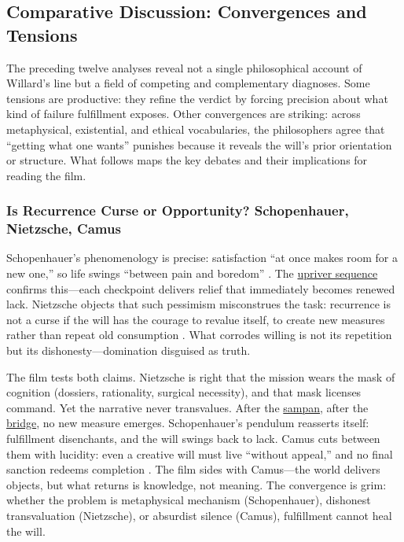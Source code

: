\subsection*{Comparative Discussion: Convergences and Tensions}
\label{ssec:iv-comparative-discussion}

The preceding twelve analyses reveal not a single philosophical account of Willard's line but
a field of competing and complementary diagnoses. Some tensions are productive: they refine
the verdict by forcing precision about what kind of failure fulfillment exposes. Other
convergences are striking: across metaphysical, existential, and ethical vocabularies, the
philosophers agree that ``getting what one wants'' punishes because it reveals the will's
prior orientation or structure. What follows maps the key debates and their implications for
reading the film.

\subsubsection*{Is Recurrence Curse or Opportunity? Schopenhauer, Nietzsche, Camus}

Schopenhauer's phenomenology is precise: satisfaction ``at once makes room for a new one,'' so
life swings ``between pain and boredom'' \parencite[pp.~312, 319]{SchopenhauerWWR1969}. The
\hyperref[scene:upriver-journey]{upriver sequence} confirms this---each checkpoint delivers
relief that immediately becomes renewed lack. Nietzsche objects that such pessimism
misconstrues the task: recurrence is not a curse if the will has the courage to revalue
itself, to create new measures rather than repeat
old consumption \parencite[\S\S 34, 283]{NietzscheBGE1990}. What corrodes willing is not its
repetition but its dishonesty---domination disguised as truth.

The film tests both claims. Nietzsche is right that the mission wears the mask of cognition
(dossiers, rationality, surgical necessity), and that mask licenses command. Yet the narrative
never transvalues. After the \hyperref[scene:sampan]{sampan}, after the
\hyperref[scene:do-lung-bridge]{bridge}, no new measure emerges. Schopenhauer's
pendulum reasserts itself: fulfillment disenchants, and the will swings back to lack. Camus
cuts between them with lucidity: even a creative will must live ``without appeal,'' and no
final sanction redeems completion \parencite[pp.~28, 54, 121--123]{CamusMyth1991}. The film
sides with Camus---the world delivers objects, but what returns is knowledge, not meaning. The
convergence is grim: whether the problem is metaphysical mechanism (Schopenhauer), dishonest
transvaluation (Nietzsche), or absurdist silence (Camus), fulfillment cannot heal the will.

